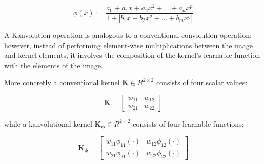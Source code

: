 \documentclass[conference]{IEEEtran}
\begin{document}
\begin{equation*}
    \phi(x) := \frac{a_0 + a_1x + a_2x^2 + \dots + a_nx^p}{1 + |b_1x + b_2x^2 + \dots + b_mx^q|}
\end{equation*}

A Kanvolution operation is analogous to a conventional convolution operation;
however, instead of performing element-wise multiplications between the image
and kernel elements, it involves the composition of the kernel's learnable
function with the elements of the image.

More concretly a conventional kernel $\mathbf{K} \in R^{2 \times 2}$ consists
of four scalar values:

\begin{equation*}
    \mathbf{K} =    \begin{bmatrix}
        w_{11} & w_{12} \\
        w_{21} & w_{22}
    \end{bmatrix}
\end{equation*}

while a kanvolutional kernel $\mathbf{K_\phi} \in R^{2 \times 2}$ consists of
four learnable functions:

\begin{equation*}
    \mathbf{K_\phi}= \begin{bmatrix}
        w_{11}\phi_{11}(\cdot) & w_{12}\phi_{12}(\cdot) \\
        w_{21}\phi_{21}(\cdot) & w_{22}\phi_{22}(\cdot)
    \end{bmatrix}
\end{equation*}
\end{document}

